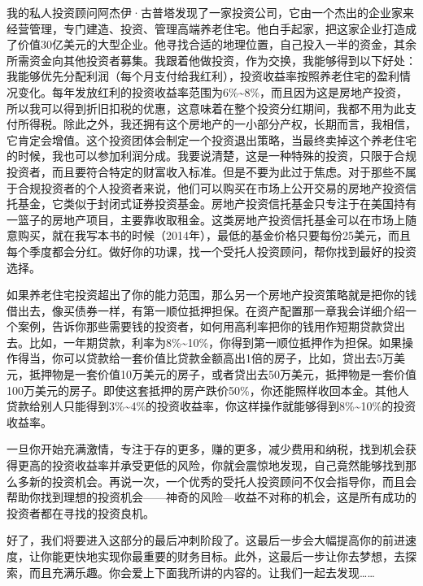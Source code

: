 我的私人投资顾问阿杰伊·古普塔发现了一家投资公司，它由一个杰出的企业家来经营管理，专门建造、投资、管理高端养老住宅。他白手起家，把这家企业打造成了价值30亿美元的大型企业。他寻找合适的地理位置，自己投入一半的资金，其余所需资金向其他投资者募集。我跟着他做投资，作为交换，我能够得到以下好处：我能够优先分配利润（每个月支付给我红利），投资收益率按照养老住宅的盈利情况变化。每年发放红利的投资收益率范围为6\%\textasciitilde{}8\%，而且因为这是房地产投资，所以我可以得到折旧扣税的优惠，这意味着在整个投资分红期间，我都不用为此支付所得税。除此之外，我还拥有这个房地产的一小部分产权，长期而言，我相信，它肯定会增值。这个投资团体会制定一个投资退出策略，当最终卖掉这个养老住宅的时候，我也可以参加利润分成。我要说清楚，这是一种特殊的投资，只限于合规投资者，而且要符合特定的财富收入标准。但是不要为此过于焦虑。对于那些不属于合规投资者的个人投资者来说，他们可以购买在市场上公开交易的房地产投资信托基金，它类似于封闭式证券投资基金。房地产投资信托基金只专注于在美国持有一篮子的房地产项目，主要靠收取租金。这类房地产投资信托基金可以在市场上随意购买，就在我写本书的时候（2014年），最低的基金价格只要每份25美元，而且每个季度都会分红。做好你的功课，找一个受托人投资顾问，帮你找到最好的投资选择。

如果养老住宅投资超出了你的能力范围，那么另一个房地产投资策略就是把你的钱借出去，像买债券一样，有第一顺位抵押担保。在资产配置那一章我会详细介绍一个案例，告诉你那些需要钱的投资者，如何用高利率把你的钱用作短期贷款贷出去。比如，一年期贷款，利率为8\%\textasciitilde{}10\%，你得到第一顺位抵押作为担保。如果操作得当，你可以贷款给一套价值比贷款金额高出1倍的房子，比如，贷出去5万美元，抵押物是一套价值10万美元的房子，或者贷出去50万美元，抵押物是一套价值100万美元的房子。即使这套抵押的房产跌价50\%，你还能照样收回本金。其他人贷款给别人只能得到3\%\textasciitilde{}4\%的投资收益率，你这样操作就能够得到8\%\textasciitilde{}10\%的投资收益率。

一旦你开始充满激情，专注于存的更多，赚的更多，减少费用和纳税，找到机会获得更高的投资收益率并承受更低的风险，你就会震惊地发现，自己竟然能够找到那么多新的投资机会。再说一次，一个优秀的受托人投资顾问不仅会指导你，而且会帮助你找到理想的投资机会——神奇的风险—收益不对称的机会，这是所有成功的投资者都在寻找的投资良机。

好了，我们将要进入这部分的最后冲刺阶段了。这最后一步会大幅提高你的前进速度，让你能更快地实现你最重要的财务目标。此外，这最后一步让你去梦想，去探索，而且充满乐趣。你会爱上下面我所讲的内容的。让我们一起去发现……
